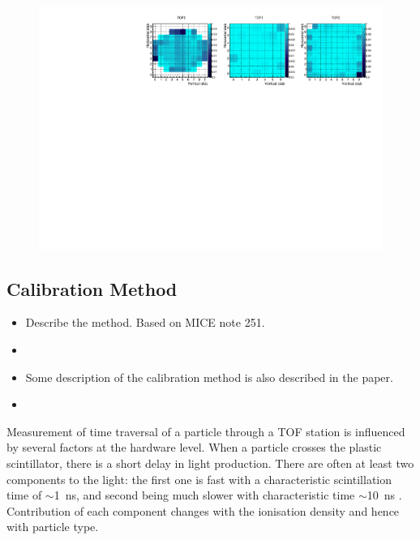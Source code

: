 \begin{figure}
  \begin{center}
  \includegraphics[width=15cm]{08_sp_eff_by_pixel_2d} \\
  \caption{}
  \label{fig:SpEffByPixel}
  \end{center}
\end{figure}




\subsection{Calibration Method}
\begin{itemize}
\item Describe the method. Based on MICE note 251.

\item {}

\item  Some description of the calibration method is also described in the
  paper.


\item  {}

\end{itemize}

Measurement of time traversal of a particle through a TOF station is
influenced by several factors at the hardware level. When a particle
crosses the plastic scintillator, there is a short delay in light
production. There are often at least two components to the light: the
first one is fast with a characteristic scintillation time of
$\sim$1~ns, and second being much slower with characteristic time
$\sim$10~ns . Contribution of each
component changes with the ionisation density and hence with particle
type.

